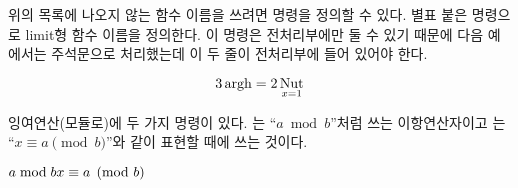 위의 목록에 나오지 않는 함수 이름을 쓰려면  명령을 정의할 수 있다.
별표 붙은 명령으로 limit형 함수 이름을 정의한다.
이 명령은 전처리부에만 둘 수 있기 때문에 다음 예에서는 주석문으로 처리했는데 이 두 줄이 전처리부에 
들어 있어야 한다.

\begin{example}
\begin{equation*}
  3\operatorname{argh} = 2\operatorname*{Nut}_{x=1}    
\end{equation*}
\end{example}


잉여연산(모듈로)에 두 가지 명령이 있다. 는 ``$a \bmod b$''처럼 쓰는 이항연산자이고 
는 ``$x\equiv a \pmod{b}$''와 같이 표현할 때에 쓰는 것이다.
\begin{example}
$a\bmod b \\
 x\equiv a \pmod{b}$
\end{example}


